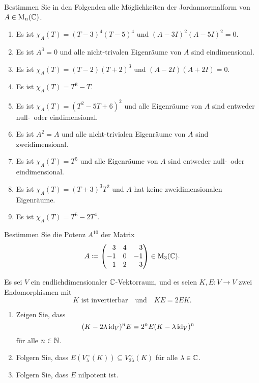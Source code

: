 \begin{question}[subtitle = Bestimmung möglicher Jordannormalformen]{2}
  Bestimmen Sie in den Folgenden alle Möglichkeiten der Jordannormalform von $A \in \operatorname{M}_n(\mathbb{C})$.
  \begin{enumerate}[leftmargin=*]
    \item
     Es ist $\chi_A(T) = (T-3)^4 (T-5)^4$ und $(A - 3I)^2 (A - 5I)^2 = 0$.
    \item
      Es ist $A^3 = 0$ und alle nicht-trivalen Eigenräume von $A$ sind eindimensional.
    \item
      Es ist $\chi_A(T) = (T-2)(T+2)^3$ und $(A - 2I)(A + 2I) = 0$.
    \item
      Es ist $\chi_A(T) = T^3 - T$.
    \item
      Es ist $\chi_A(T) = (T^2 -5T + 6)^2$ und alle Eigenräume von $A$ sind entweder null-\ oder eindimensional.
    \item
      Es ist $A^2 = A$ und alle nicht-trivialen Eigenräume von $A$ sind zweidimensional.
    \item
      Es ist $\chi_A(T) = T^5$ und alle Eigenräume von $A$ sind entweder null-\ oder eindimensional.
    \item
      Es ist $\chi_A(T) = (T+3)^3 T^2$ und $A$ hat keine zweidimensionalen Eigenräume.
    \item
      Es ist $\chi_A(T) = T^5 - 2 T^4$.
  \end{enumerate}
\end{question}


\begin{question}{2}
  Bestimmen Sie die Potenz $A^{10}$ der Matrix
  \[
    A
    \coloneqq
    \begin{pmatrix*}[r]
       3  & 4 &  3      \\
      -1  & 0 & -1      \\
       1  & 2 &  3
    \end{pmatrix*}
    \in \Mat_3(\Cbb).
  \]
\end{question}







\begin{question}[subtitle = Shiften von Haupträumen]{3}
  Es sei $V$ ein endlichdimensionaler $\mathbb{C}$-Vektorraum, und es seien $K, E \colon V \to V$ zwei Endomorphismen mit
  \[
    \text{$K$ ist invertierbar}
    \quad\text{und}\quad
    KE = 2EK.
  \]
  \begin{enumerate}[leftmargin=*]
    \item
      Zeigen Sie, dass
      \[
        (K - 2 \lambda \operatorname{id}_V)^n E = 2^n E (K - \lambda \operatorname{id}_V)^n
      \]
      für alle $n \in \mathbb{N}$.
    \item
      Folgern Sie, dass $E( V^\sim_\lambda(K) ) \subseteq V^\sim_{2\lambda}(K)$ für alle $\lambda \in \mathbb{C}$.
    \item
      Folgern Sie, dass $E$ nilpotent ist.
  \end{enumerate}
\end{question}


